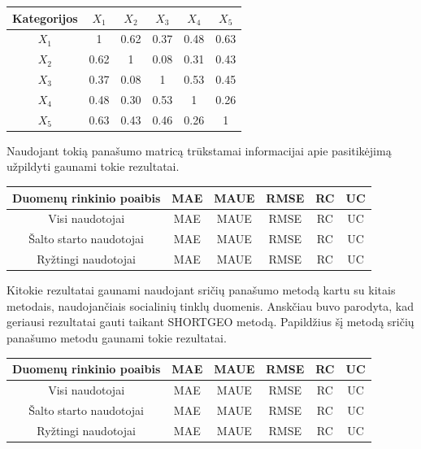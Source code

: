 \documentclass{VUMIFInfMagistrinis}
\begin{document}
\begin{center}
	\begin{tabular}{||c c c c c c||} 
		\hline
		Kategorijos & $X_1$ & $X_2$ & $X_3$ & $X_4$ & $X_5$ \\ [0.5ex] 
		\hline\hline
		$X_1$ & 1 & 0.62 & 0.37 & 0.48 & 0.63 \\ 
		\hline
		$X_2$ & 0.62 & 1 & 0.08 & 0.31 & 0.43 \\
		\hline
		$X_3$ & 0.37 & 0.08 & 1 & 0.53 & 0.45 \\
		\hline
		$X_4$ & 0.48 & 0.30 & 0.53 & 1 & 0.26 \\
		\hline
		$X_5$ & 0.63 & 0.43 & 0.46 & 0.26 & 1 \\ [1ex] 
		\hline
	\end{tabular}
\end{center}
Naudojant tokią panašumo matricą trūkstamai informacijai apie pasitikėjimą užpildyti gaunami tokie rezultatai.
\begin{center}
	\begin{tabular}{||c c c c c c||} 
		Duomenų rinkinio poaibis & MAE & MAUE & RMSE & RC & UC \\
		\hline
		Visi naudotojai & MAE & MAUE & RMSE & RC & UC \\
		\hline
		Šalto starto naudotojai & MAE & MAUE & RMSE & RC & UC \\
		\hline
		Ryžtingi naudotojai & MAE & MAUE & RMSE & RC & UC \\
	\end{tabular}
\end{center}
\indent 
Kitokie rezultatai gaunami naudojant sričių panašumo metodą kartu su kitais metodais, naudojančiais socialinių tinklų duomenis. Anskčiau buvo parodyta, kad geriausi rezultatai gauti taikant SHORTGEO metodą. Papildžius šį metodą sričių panašumo metodu gaunami tokie rezultatai.
\begin{center}
	\begin{tabular}{||c c c c c c||} 
		Duomenų rinkinio poaibis & MAE & MAUE & RMSE & RC & UC \\
		\hline
		Visi naudotojai & MAE & MAUE & RMSE & RC & UC \\
		\hline
		Šalto starto naudotojai & MAE & MAUE & RMSE & RC & UC \\
		\hline
		Ryžtingi naudotojai & MAE & MAUE & RMSE & RC & UC \\
	\end{tabular}
\end{center}
\end{document}
